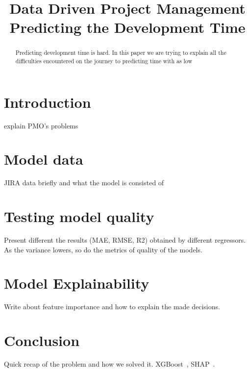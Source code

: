 \documentclass[conference,compsoc]{IEEEtran}
\begin{document}
\title{Data Driven Project Management \\ Predicting the Development Time}


\author{
}

\maketitle

\begin{abstract}
Predicting development time is hard. In this paper we are trying to explain all the difficulties encountered on the journey to predicting time with as low 
\end{abstract}

\IEEEpeerreviewmaketitle

\section{Introduction}
explain PMO's problems
\section{Model data}
JIRA data briefly and what the model is consisted of



\section{Testing model quality}
Present different the results (MAE, RMSE, R2) obtained by different regressors.
As the variance lowers, so do the metrics of quality of the models.
\section{Model Explainability}
Write about feature importance and how to explain the made decisions.


\section{Conclusion}
Quick recap of the problem and how we solved it.
XGBoost~\cite{chen2016xgXGBoost}, SHAP~\cite{lundberg2020local2global}.
\end{document}
